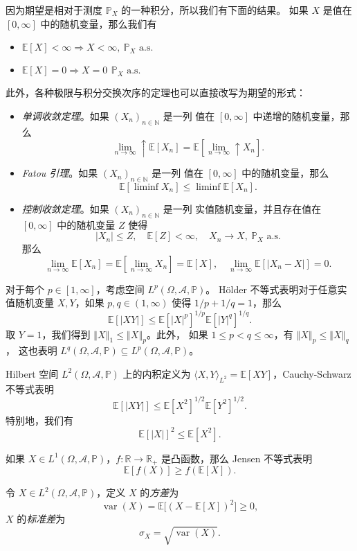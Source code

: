 \documentclass[fontset=none]{Notes}
\DeclareMathOperator\var{var}
\newcommand{\ulim}[1][]{\lim_{#1}\mathrel{\uparrow}}
\newcommand{\alsu}[1]{\text{$#1$ a.s.}}
\newcommand{\norm}[1]{\left\Vert#1\right\Vert}
\begin{document}
因为期望是相对于测度 $\mathbb{P}_X$ 的一种积分，所以我们有下面的结果。
如果 $X$ 是值在 $[0,\infty]$ 中的随机变量，那么我们有
\begin{itemize}[nosep]
  \item $\mathbb{E}[X]<\infty\Rightarrow X<\infty,\ \alsu{\mathbb{P}_X}$
  \item $\mathbb{E}[X]=0\Rightarrow X=0\,\ \alsu{\mathbb{P}_X}$
\end{itemize}
此外，各种极限与积分交换次序的定理也可以直接改写为期望的形式：
\begin{itemize}[nosep]
  \item \emph{单调收敛定理}。如果 $(X_n)_{n\in \mathbb{N}}$ 是一列
  值在 $[0,\infty]$ 中递增的随机变量，那么
  \[
    \ulim[n\to\infty]  \mathbb{E}[X_n]=\mathbb{E}\left[\ulim[n\to\infty]X_n\right].
  \]
  \item \emph{Fatou 引理}。如果 $(X_n)_{n\in \mathbb{N}}$ 是一列
  值在 $[0,\infty]$ 中的随机变量，那么
  \[
    \mathbb{E}[\liminf X_n]\leq \liminf \mathbb{E}[X_n].  
  \]
  \item \emph{控制收敛定理}。如果 $(X_n)_{n\in \mathbb{N}}$ 是一列
  实值随机变量，并且存在值在 $[0,\infty]$ 中的随机变量 $Z$ 使得
  \[
    |X_n|\leq Z,\quad \mathbb{E}[Z]<\infty, \quad X_n\to X,\ 
    \alsu{\mathbb{P}_X}  
  \]
  那么
  \[
    \lim_{n\to\infty}\mathbb{E}[X_n]=\mathbb{E}\left[\lim_{n\to\infty}X_n\right]=\mathbb{E}[X],
    \quad \lim_{n\to\infty}\mathbb{E}[|X_n-X|]=0.
  \]
\end{itemize}

对于每个 $p\in[1,\infty]$，考虑空间 $L^p(\Omega,\mathcal{A},\mathbb{P})$。
H\"older 不等式表明对于任意实值随机变量 $X,Y$，如果 $p,q\in (1,\infty)$
使得 $1/p+1/q=1$，那么
\[
  \mathbb{E}[|XY|]\leq \mathbb{E}[|X|^p]^{1/p}\mathbb{E}[|Y|^q]^{1/q}. 
\]
取 $Y=1$，我们得到 $\norm{X}_1\leq\norm{X}_p$。此外，
如果 $1\leq p<q\leq \infty$，有 $\norm{X}_p\leq \norm{X}_q$，
这也表明 $L^q(\Omega, \mathcal{A},\mathbb{P})\subseteq L^p(\Omega,\mathcal{A},\mathbb{P})$。

Hilbert 空间 $L^2(\Omega,\mathcal{A},\mathbb{P})$ 上的内积定义为
$\langle X,Y\rangle_{L^2}=\mathbb{E}[XY]$，Cauchy-Schwarz 不等式表明
\[
  \mathbb{E}[|XY|]\leq \mathbb{E}[X^2]  ^{1/2}\mathbb{E}[Y^2]^{1/2}.
\]
特别地，我们有
\[
  \mathbb{E}[|X|]^2\leq \mathbb{E}[X^2].  
\]

如果 $X\in L^1(\Omega,\mathcal{A},\mathbb{P})$，$f:\mathbb{R}\to \mathbb{R}_+$
是凸函数，那么 Jensen 不等式表明 
\[
  \mathbb{E}[f(X)]\geq f(\mathbb{E}[X]).
\]

\begin{definition}
  令 $X\in L^2(\Omega,\mathcal{A},\mathbb{P})$，定义 $X$
  的\emph{方差}为
  \[
    \var(X)=\mathbb{E}\bigl[(X-\mathbb{E}[X])^2\bigr]\geq 0,
  \]
  $X$ 的\emph{标准差}为
  \[
    \sigma_X=\sqrt{\var(X)}.  
  \]
\end{definition}
\end{document}
